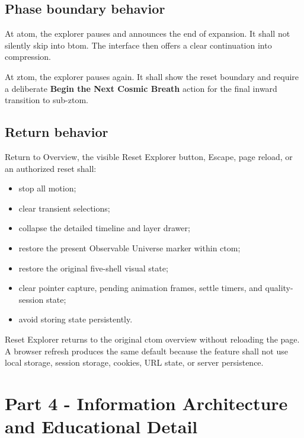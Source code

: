 \documentclass[11pt,letterpaper]{article}
\newcommand{\term}[1]{\textbf{\textsf{#1}}}
\begin{document}
\subsection{Phase boundary behavior}
At atom, the explorer pauses and announces the end of expansion. It shall not silently skip into btom. The interface then offers a clear continuation into compression.

At ztom, the explorer pauses again. It shall show the reset boundary and require a deliberate \term{Begin the Next Cosmic Breath} action for the final inward transition to sub-ztom.

\subsection{Return behavior}
Return to Overview, the visible Reset Explorer button, Escape, page reload, or an authorized reset shall:
\begin{itemize}
\item stop all motion;
\item clear transient selections;
\item collapse the detailed timeline and layer drawer;
\item restore the present Observable Universe marker within ctom;
\item restore the original five-shell visual state;
\item clear pointer capture, pending animation frames, settle timers, and quality-session state;
\item avoid storing state persistently.
\end{itemize}

Reset Explorer returns to the original ctom overview without reloading the page. A browser refresh produces the same default because the feature shall not use local storage, session storage, cookies, URL state, or server persistence.

\section{Part 4 - Information Architecture and Educational Detail}
\end{document}
